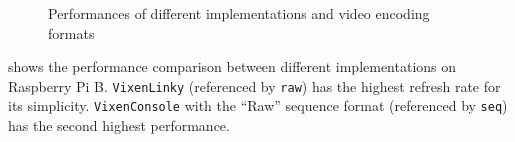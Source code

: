 \begin{figure}[t]
  \centering
  \hfil
  \hfil
  \caption{\footnotesize Performances of different implementations and video encoding formats}
  \label{fig:perf}
\end{figure}

 shows the performance comparison between different implementations on Raspberry Pi B. \texttt{VixenLinky} (referenced by \texttt{raw}) has the highest refresh rate for its simplicity. \texttt{VixenConsole} with the ``Raw'' sequence format (referenced by \texttt{seq}) has the second highest performance. 

